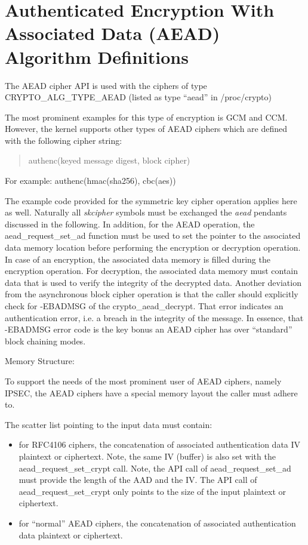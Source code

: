 \documentclass[a4paper,8pt,english]{sphinxmanual}
\begin{document}
\section{Authenticated Encryption With Associated Data (AEAD) Algorithm Definitions}
\label{crypto/api-aead:authenticated-encryption-with-associated-data-aead-algorithm-definitions}\label{crypto/api-aead::doc}
The AEAD cipher API is used with the ciphers of type CRYPTO\_ALG\_TYPE\_AEAD
(listed as type ``aead'' in /proc/crypto)

The most prominent examples for this type of encryption is GCM and CCM.
However, the kernel supports other types of AEAD ciphers which are defined
with the following cipher string:
\begin{quote}

authenc(keyed message digest, block cipher)
\end{quote}

For example: authenc(hmac(sha256), cbc(aes))

The example code provided for the symmetric key cipher operation
applies here as well. Naturally all \emph{skcipher} symbols must be exchanged
the \emph{aead} pendants discussed in the following. In addition, for the AEAD
operation, the aead\_request\_set\_ad function must be used to set the
pointer to the associated data memory location before performing the
encryption or decryption operation. In case of an encryption, the associated
data memory is filled during the encryption operation. For decryption, the
associated data memory must contain data that is used to verify the integrity
of the decrypted data. Another deviation from the asynchronous block cipher
operation is that the caller should explicitly check for -EBADMSG of the
crypto\_aead\_decrypt. That error indicates an authentication error, i.e.
a breach in the integrity of the message. In essence, that -EBADMSG error
code is the key bonus an AEAD cipher has over ``standard'' block chaining
modes.

Memory Structure:

To support the needs of the most prominent user of AEAD ciphers, namely
IPSEC, the AEAD ciphers have a special memory layout the caller must adhere
to.

The scatter list pointing to the input data must contain:
\begin{itemize}
\item {} 
for RFC4106 ciphers, the concatenation of
associated authentication data \textbar{}\textbar{} IV \textbar{}\textbar{} plaintext or ciphertext. Note, the
same IV (buffer) is also set with the aead\_request\_set\_crypt call. Note,
the API call of aead\_request\_set\_ad must provide the length of the AAD and
the IV. The API call of aead\_request\_set\_crypt only points to the size of
the input plaintext or ciphertext.

\item {} 
for ``normal'' AEAD ciphers, the concatenation of
associated authentication data \textbar{}\textbar{} plaintext or ciphertext.

\end{itemize}
\end{document}
